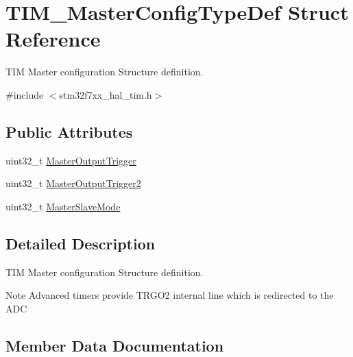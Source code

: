\hypertarget{struct_t_i_m___master_config_type_def}{}\section{T\+I\+M\+\_\+\+Master\+Config\+Type\+Def Struct Reference}
\label{struct_t_i_m___master_config_type_def}


T\+IM Master configuration Structure definition.  




{\ttfamily \#include $<$stm32f7xx\+\_\+hal\+\_\+tim.\+h$>$}

\subsection*{Public Attributes}
\begin{DoxyCompactItemize}
\item 
uint32\+\_\+t \mbox{\hyperlink{struct_t_i_m___master_config_type_def_a908a6c1b46cb203c0b8b59b490e1114e}{Master\+Output\+Trigger}}
\item 
uint32\+\_\+t \mbox{\hyperlink{struct_t_i_m___master_config_type_def_a5c9db1837051b5b2927bc4d726e980fe}{Master\+Output\+Trigger2}}
\item 
uint32\+\_\+t \mbox{\hyperlink{struct_t_i_m___master_config_type_def_a45ddfca310a1180e19fc24b36f8e9585}{Master\+Slave\+Mode}}
\end{DoxyCompactItemize}


\subsection{Detailed Description}
T\+IM Master configuration Structure definition. 

\begin{DoxyNote}{Note}
Advanced timers provide T\+R\+G\+O2 internal line which is redirected to the A\+DC 
\end{DoxyNote}


\subsection{Member Data Documentation}
\mbox{\label{struct_t_i_m___master_config_type_def_a908a6c1b46cb203c0b8b59b490e1114e}} 

